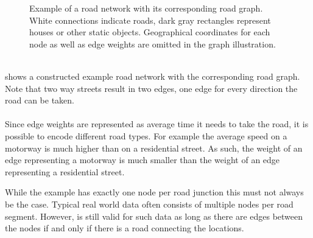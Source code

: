 \begin{figure}[!ht]
\begin{center}
		\end{center}
		\caption{Example of a road network with its corresponding road graph. White connections indicate roads,
			dark gray rectangles represent houses or other static objects.
			Geographical coordinates for each node as well as edge weights are omitted in the graph illustration.}
		\label{roadGraphExample}
	\end{figure}\quad\\
	 shows a constructed example road network with the corresponding road graph.
	Note that two way streets result in two edges, one edge for every direction the road can be taken.\\\\
	Since edge weights are represented as average time it needs to take the road, it is possible to encode different road types.
	For example the average speed on a motorway is much higher than on a residential street. As such, the weight of an edge
	representing a motorway is much smaller than the weight of an edge representing a residential street.
	
	While the example has exactly one node per road junction this must not always be the case. Typical real world data often consists
	of multiple nodes per road segment. However,  is still valid for such data as long as there are edges
	between the nodes if and only if there is a road connecting the locations.

